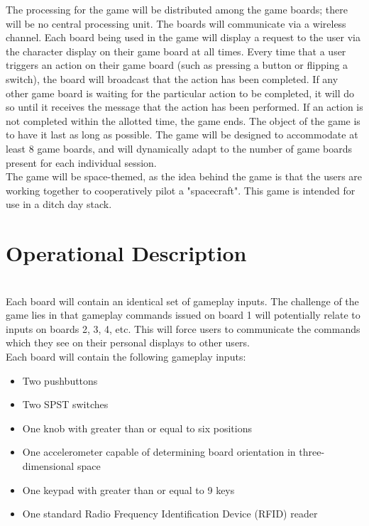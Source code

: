 \documentclass[aps,letterpaper,10pt]{revtex4}
\begin{document}
The processing for the game will be distributed among the game boards; there will be no central processing unit. The boards will communicate via a wireless channel. Each board being used in the game will display a request to the user via the character display on their game board at all times. Every time that a user triggers an action on their game board (such as pressing a button or flipping a switch), the board will broadcast that the action has been completed. If any other game board is waiting for the particular action to be completed, it will do so until it receives the message that the action has been performed. If an action is not completed within the allotted time, the game ends. The object of the game is to have it last as long as possible. The game will be designed to accommodate at least 8 game boards, and will dynamically adapt to the number of game boards present for each individual session.\\

The game will be space-themed, as the idea behind the game is that the users are working together to cooperatively pilot a "spacecraft". This game is intended for use in a  ditch day stack. 

\section{Operational Description}

\\

Each board will contain an identical set of gameplay inputs. The challenge of the game lies in that gameplay commands issued on board 1 will potentially relate to inputs on boards 2, 3, 4, etc. This will force users to communicate the commands which they see on their personal displays to other users. \\ 

Each board will contain the following gameplay inputs:
\begin{itemize}
\item Two pushbuttons
\item Two SPST switches
\item One knob with greater than or equal to six positions
\item One accelerometer capable of determining board orientation in three-dimensional space 
\item One keypad with greater than or equal to 9 keys
\item One standard Radio Frequency Identification Device (RFID) reader
\end{itemize}
\end{document}
